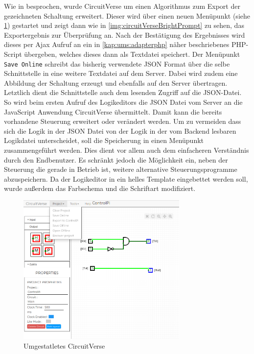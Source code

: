  Wie in  besprochen, wurde CircuitVerse um einen Algorithmus zum Export der gezeichneten Schaltung erweitert. Dieser wird über einen neuen Menüpunkt (siehe \ref{img:circuitVerseBright}) gestartet und zeigt dann wie in \autoref{img:circuitVerseBrightPrompt} zu sehen, das Exportergebnis zur Überprüfung an. Nach der Bestätigung des Ergebnisses wird dieses per Ajax Aufruf an ein in \autoref{kap:ums:adapterphp} näher beschriebenes PHP-Script übergeben, welches dieses dann als Textdatei speichert. Der Menüpunkt \texttt{Save Online} schreibt das bisherig verwendete JSON Format über die selbe Schnittstelle in eine weitere Textdatei auf dem Server. Dabei wird zudem eine Abbildung der Schaltung erzeugt und ebenfalls auf den Server übertragen. Letztlich dient die Schnittstelle auch dem lesenden Zugriff auf die JSON-Datei. So wird beim ersten Aufruf des Logikeditors die JSON Datei vom Server an die JavaScript Anwendung CircuitVerse übermittelt. Damit kann die bereits vorhandene Steuerung erweitert oder verändert werden. Um zu vermeiden dass sich die Logik in der JSON Datei von der Logik in der vom Backend lesbaren Logikdatei unterscheidet, soll die Speicherung in einen Menüpunkt zusammengeführt werden. Dies dient vor allem auch dem einfacheren Verständnis durch den Endbenutzer. Es schränkt jedoch die Möglichkeit ein, neben der Steuerung die gerade in Betrieb ist, weitere alternative Steuerungsprogramme abzuspeichern. Da der Logikeditor in ein helles Template eingebettet werden soll, wurde außerdem das Farbschema und die Schriftart modifiziert. 
 

\begin{figure}[H]
	\begin{center}
		\includegraphics[width=0.75\textwidth ,clip]{./images/circuitverseLogicBright.png}
		\caption{Umgestatletes CircuitVerse}
		\label{img:circuitVerseBright}
	\end{center} 
\end{figure}

